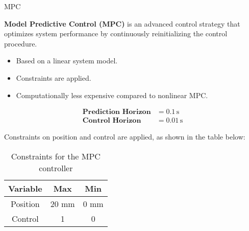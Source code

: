 \begin{frame}{MPC}

    \textbf{Model Predictive Control (MPC)} is an advanced control strategy that optimizes system performance by continuously reinitializing the control procedure.

    \begin{itemize}
        \item Based on a linear system model.
        \item Constraints are applied.
        \item Computationally less expensive compared to nonlinear MPC.
    \end{itemize}

    \begin{equation}
        \begin{aligned}
            \textbf{Prediction Horizon} & = 0.1 \, \text{s}  \\
            \textbf{Control Horizon}    & = 0.01 \, \text{s}
        \end{aligned}
    \end{equation}

    Constraints on position and control are applied, as shown in the table below:

    \begin{table}[H]
        \centering
        \begin{tabular}{|c|c|c|}
            \hline
            \textbf{Variable} & \textbf{Max} & \textbf{Min} \\
            \hline
            Position          & 20 mm        & 0 mm         \\
            \hline
            Control           & 1            & 0            \\
            \hline
        \end{tabular}
        \caption{Constraints for the MPC controller}
    \end{table}
\end{frame}
